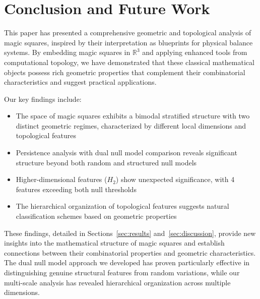 \section{Conclusion and Future Work}
\label{sec:conclusion}

This paper has presented a comprehensive geometric and topological analysis of magic squares, inspired by their interpretation as blueprints for physical balance systems. By embedding magic squares in $\mathbb{R}^3$ and applying enhanced tools from computational topology, we have demonstrated that these classical mathematical objects possess rich geometric properties that complement their combinatorial characteristics and suggest practical applications.

Our key findings include:
\begin{itemize}
    \item The space of magic squares exhibits a bimodal stratified structure with two distinct geometric regimes, characterized by different local dimensions and topological features
    \item Persistence analysis with dual null model comparison reveals significant structure beyond both random and structured null models
    \item Higher-dimensional features ($H_2$) show unexpected significance, with 4 features exceeding both null thresholds
    \item The hierarchical organization of topological features suggests natural classification schemes based on geometric properties
\end{itemize}

These findings, detailed in Sections~\ref{sec:results} and~\ref{sec:discussion}, provide new insights into the mathematical structure of magic squares and establish connections between their combinatorial properties and geometric characteristics. The dual null model approach we developed has proven particularly effective in distinguishing genuine structural features from random variations, while our multi-scale analysis has revealed hierarchical organization across multiple dimensions.

